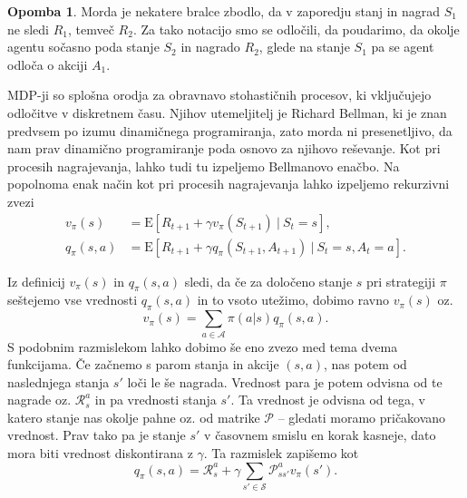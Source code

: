 \documentclass[12pt,a4paper]{amsart}
\theoremstyle{definition} %
\newtheorem{opomba}[definicija]{Opomba}
\theoremstyle{plain} %
\begin{document}
\begin{opomba}
    Morda je nekatere bralce zbodlo, da v zaporedju stanj in nagrad $S_1$ ne sledi $R_1$, temveč 
    $R_2$. Za tako notacijo smo se odločili, da poudarimo, da okolje agentu sočasno poda stanje $S_2$
    in nagrado $R_2$, glede na stanje $S_1$ pa se agent odloča o akciji $A_1$.
\end{opomba}

MDP-ji so splošna orodja za obravnavo stohastičnih procesov, ki vključujejo odločitve v diskretnem 
času. Njihov utemeljitelj je Richard Bellman, ki je znan predvsem po izumu dinamičnega 
programiranja, zato morda ni presenetljivo, da nam prav dinamično programiranje poda osnovo za 
njihovo reševanje.
Kot pri procesih nagrajevanja, lahko tudi tu izpeljemo Bellmanovo enačbo. Na popolnoma enak način 
kot pri procesih nagrajevanja lahko izpeljemo rekurzivni zvezi
\begin{align*}
    v_\pi(s) &= \mathrm{E} [R_{t+1} + \gamma v_\pi(S_{t+1})~|~S_t = s], \\
    q_\pi(s, a) &= \mathrm{E} [R_{t+1} + \gamma q_\pi(S_{t+1}, A_{t+1})~|~S_t = s, A_t = a].
\end{align*}

Iz definicij $v_\pi(s)$ in $q_\pi(s, a)$ sledi, da če za določeno stanje $s$ pri strategiji $\pi$ 
seštejemo vse vrednosti $q_\pi(s, a)$ in to vsoto utežimo, dobimo ravno $v_\pi(s)$ oz. 
\begin{equation}\label{zveza1}
    v_\pi(s) = \sum_{a \in \mathcal{A}} \pi(a|s)q_\pi(s, a).
\end{equation}
S podobnim razmislekom lahko dobimo še eno zvezo med tema dvema funkcijama. Če začnemo s parom stanja 
in akcije $(s, a)$, nas potem od naslednjega stanja $s'$ loči le še nagrada. Vrednost para je potem 
odvisna od te nagrade oz. $\mathcal{R}_s^a$ in pa vrednosti stanja $s'$. Ta vrednost je odvisna od tega, 
v katero stanje nas okolje pahne oz. od matrike $\mathcal{P}$ -- gledati moramo pričakovano vrednost. 
Prav tako pa je stanje $s'$ v časovnem smislu en korak kasneje, dato mora biti vrednost diskontirana z 
$\gamma$. Ta razmislek zapišemo kot
\begin{equation}\label{zveza2}
    q_\pi(s, a) = \mathcal{R}_s^a + \gamma \sum_{s' \in \mathcal{S}} \mathcal{P}_{ss'}^a v_\pi(s').
\end{equation}
\end{document}
